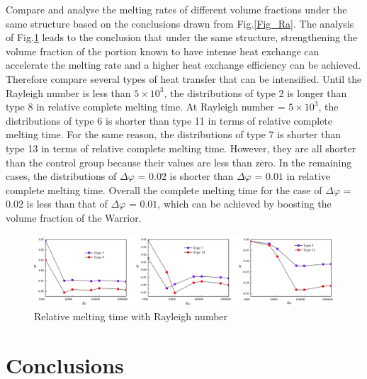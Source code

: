 \documentclass[preprint,12pt]{elsarticle}
\begin{document}
Compare and analyse the melting rates of different volume fractions under the same structure based on the conclusions drawn from Fig.\ref{Fig_Ra}. The analysis of Fig.\ref{Fig_3.3fl2} leads to the conclusion that under the same structure, strengthening the volume fraction of the portion known to have intense heat exchange can accelerate the melting rate and a higher heat exchange efficiency can be achieved.
Therefore compare several types of heat transfer that can be intensified.
Until the Rayleigh number is less than $ 5\times10^3 $, the distributions of type 2 is longer than type 8 in relative complete melting time.
At Rayleigh number = $ 5\times10^3 $, the distributions of type 6 is shorter than type 11 in terms of relative complete melting time. 
For the same reason, the distributions of type 7 is shorter than type 13 in terms of relative complete melting time. 
However, they are all shorter than the control group because their values are less than zero. 
In the remaining cases, the distributions of $\Delta\varphi$ = $ 0.02 $ is shorter than $\Delta\varphi$ = $ 0.01 $ in relative complete melting time. Overall the complete melting time for the case of $\Delta\varphi$ = $ 0.02 $ is less than that of $\Delta\varphi$ = $ 0.01 $, which can be achieved by boosting the volume fraction of the Warrior.
\begin{figure}[H]
\centering
	\includegraphics[scale=0.5]{Fig/compare.png}
	\caption{Relative melting time with Rayleigh number  }  
	\label{Fig_3.3fl2} 
\end{figure}

	\section{Conclusions}	
\end{document}
